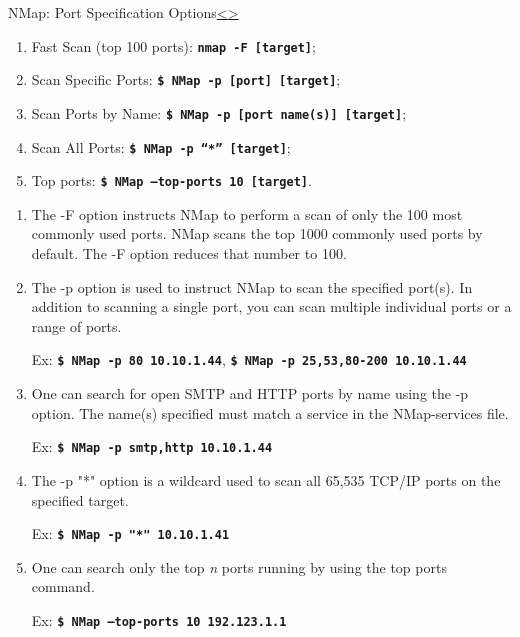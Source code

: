 \documentclass[12pt]{article}
\newcommand{\code}[1]{\texttt{\bfseries#1}}
\newenvironment{instructionblock}{\Large\bgroup}{\egroup}
\begin{document}
\pagebreak
\begin{slide}{ NMap: Port Specification Options}{\hyperref[slide 9]{\textless}\hyperref[slide 11]{\textgreater}}
\begin{instructionblock}
\begin{enumerate}
   \item Fast Scan (top 100 ports): \code{nmap -F [target]};
   \item Scan Specific Ports: \code{\$  NMap -p [port] [target]};
   \item Scan Ports by Name: \code{\$  NMap -p [port name(s)] [target]};
   \item Scan All Ports: \code{\$  NMap -p “*” [target]};
   \item Top ports: \code{\$  NMap --top-ports 10 [target]}.
\end{enumerate}
\end{instructionblock}
\end{slide}
\begin{enumerate}
\item The -F option instructs  NMap to perform a scan of only the 100 most commonly used ports.  NMap scans the top 1000 commonly used ports by default. The -F option reduces that number to 100.\cite{cookbook}

\item The -p option is used to instruct  NMap to scan the specified port(s). In addition to scanning a single port, you can scan multiple individual ports or a range of ports.\cite{cookbook}

Ex: \code{\$  NMap -p 80 10.10.1.44}, \code{\$  NMap -p 25,53,80-200 10.10.1.44}


\item One can search for open SMTP and HTTP ports by name using the -p option. The name(s) specified must match a service in the  NMap-services file.\cite{cookbook}

Ex: \code{\$  NMap -p smtp,http 10.10.1.44}

\item The -p "*" option is a wildcard used to scan all 65,535 TCP/IP ports on the specified target.\cite{cookbook} 

Ex: \code{\$  NMap -p "*" 10.10.1.41}

\item One can search only the top \emph{n} ports running by using the top ports command.\cite{cookbook}

Ex: \code{\$  NMap --top-ports 10 192.123.1.1 }
\end{enumerate}
\end{document}
